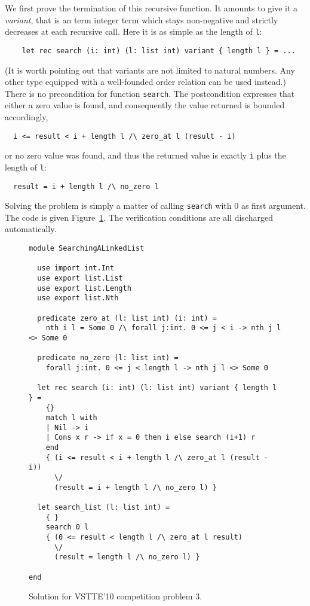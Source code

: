 We first prove the termination of this recursive function. It amounts
to give it a \emph{variant}, that is an term integer term which stays
non-negative and strictly decreases at each recursive call. Here it is
as simple as the length of \texttt{l}:
\begin{verbatim}
    let rec search (i: int) (l: list int) variant { length l } = ...
\end{verbatim}
(It is worth pointing out that variants are not limited to natural
numbers. Any other type equipped with a well-founded order relation
can be used instead.)
There is no precondition for function \texttt{search}.
The postcondition expresses that either a zero value is found, and
consequently the value returned is bounded accordingly,
\begin{verbatim}
  i <= result < i + length l /\ zero_at l (result - i)
\end{verbatim}
or no zero value was found, and thus the returned value is exactly
\texttt{i} plus the length of \texttt{l}:
\begin{verbatim}
  result = i + length l /\ no_zero l
\end{verbatim}
Solving the problem is simply a matter of calling \texttt{search} with
0 as first argument.
The code is given Figure~\ref{fig:LinkedList}. The verification
conditions are all discharged automatically.
\begin{figure}
  \centering
\begin{verbatim}
module SearchingALinkedList

  use import int.Int
  use export list.List
  use export list.Length
  use export list.Nth

  predicate zero_at (l: list int) (i: int) =
    nth i l = Some 0 /\ forall j:int. 0 <= j < i -> nth j l <> Some 0

  predicate no_zero (l: list int) =
    forall j:int. 0 <= j < length l -> nth j l <> Some 0

  let rec search (i: int) (l: list int) variant { length l } =
    {}
    match l with
    | Nil -> i
    | Cons x r -> if x = 0 then i else search (i+1) r
    end
    { (i <= result < i + length l /\ zero_at l (result - i))
      \/
      (result = i + length l /\ no_zero l) }

  let search_list (l: list int) =
    { }
    search 0 l
    { (0 <= result < length l /\ zero_at l result)
      \/
      (result = length l /\ no_zero l) }

end
\end{verbatim}
\vspace*{-2em}\hrulefill
  \caption{Solution for VSTTE'10 competition problem 3.}
  \label{fig:LinkedList}
\end{figure}


